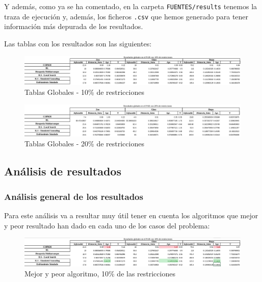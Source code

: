 \documentclass[11pt]{article}
\begin{document}
Y además, como ya se ha comentado, en la carpeta \lstinline{FUENTES/results} tenemos la traza de ejecución y, además, los ficheros \lstinline{.csv} que hemos generado para tener información más depurada de los resultados.

Las tablas con los resultados son las siguientes:

\begin{figure}[H]
    \centering
    \includegraphics[width=1.0\textwidth]{tablas_globales_10}
    \caption{Tablas Globales - 10\% de restricciones}
\end{figure}

\begin{figure}[H]
    \centering
    \includegraphics[width=1.0\textwidth]{tablas_globales_20}
    \caption{Tablas Globales - 20\% de restricciones}
\end{figure}

\subsection{Análisis de resultados}

\subsubsection{Análisis general de los resultados}

Para este análisis va a resultar muy útil tener en cuenta los algoritmos que mejor y peor resultado han dado en cada uno de los casos del problema:

\begin{figure}[H]
    \centering
    \includegraphics[width=1.0\textwidth]{tablas_mejor_peor_10}
    \caption{Mejor y peor algoritmo, 10\% de las restricciones}
\end{figure}
\end{document}
